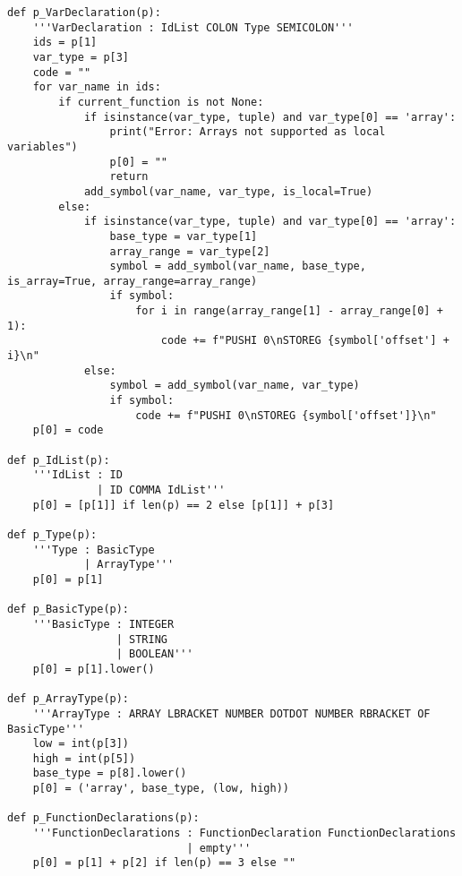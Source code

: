 \documentclass[12pt,a4paper]{report}%
\begin{document}
\begin{lstlisting}[style=pythonStyle, caption={Ficheiro lex.py}]
def p_VarDeclaration(p):
    '''VarDeclaration : IdList COLON Type SEMICOLON'''
    ids = p[1]
    var_type = p[3]
    code = ""
    for var_name in ids:
        if current_function is not None:
            if isinstance(var_type, tuple) and var_type[0] == 'array':
                print("Error: Arrays not supported as local variables")
                p[0] = ""
                return
            add_symbol(var_name, var_type, is_local=True)
        else:
            if isinstance(var_type, tuple) and var_type[0] == 'array':
                base_type = var_type[1]
                array_range = var_type[2]
                symbol = add_symbol(var_name, base_type, is_array=True, array_range=array_range)
                if symbol:
                    for i in range(array_range[1] - array_range[0] + 1):
                        code += f"PUSHI 0\nSTOREG {symbol['offset'] + i}\n"
            else:
                symbol = add_symbol(var_name, var_type)
                if symbol:
                    code += f"PUSHI 0\nSTOREG {symbol['offset']}\n"
    p[0] = code

def p_IdList(p):
    '''IdList : ID
              | ID COMMA IdList'''
    p[0] = [p[1]] if len(p) == 2 else [p[1]] + p[3]

def p_Type(p):
    '''Type : BasicType
            | ArrayType'''
    p[0] = p[1]

def p_BasicType(p):
    '''BasicType : INTEGER
                 | STRING
                 | BOOLEAN'''
    p[0] = p[1].lower()

def p_ArrayType(p):
    '''ArrayType : ARRAY LBRACKET NUMBER DOTDOT NUMBER RBRACKET OF BasicType'''
    low = int(p[3])
    high = int(p[5])
    base_type = p[8].lower()
    p[0] = ('array', base_type, (low, high))

def p_FunctionDeclarations(p):
    '''FunctionDeclarations : FunctionDeclaration FunctionDeclarations
                            | empty'''
    p[0] = p[1] + p[2] if len(p) == 3 else ""


\end{lstlisting}
\end{document}
